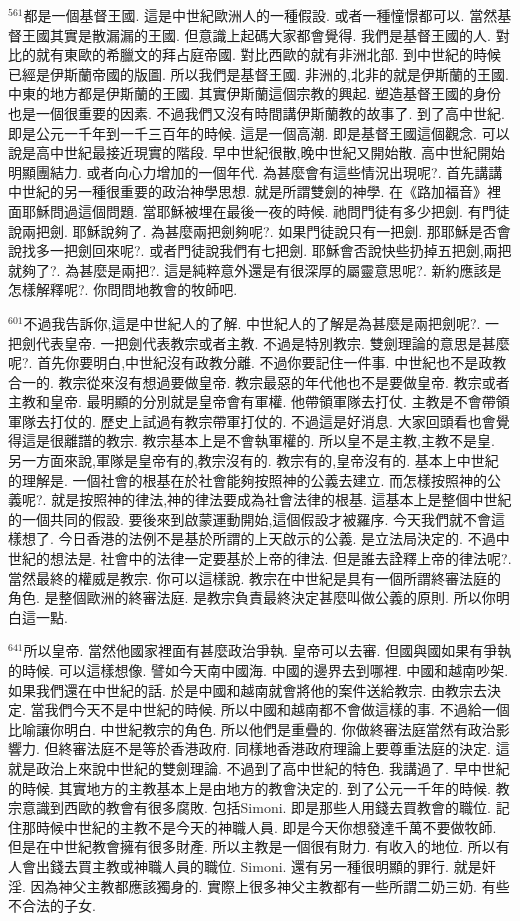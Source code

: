 \documentclass{book}
\begin{document}
$^{561}$都是一個基督王國.
這是中世紀歐洲人的一種假設.
或者一種憧憬都可以.
當然基督王國其實是散漏漏的王國.
但意識上起碼大家都會覺得.
我們是基督王國的人.
對比的就有東歐的希臘文的拜占庭帝國.
對比西歐的就有非洲北部.
到中世紀的時候已經是伊斯蘭帝國的版圖.
所以我們是基督王國.
非洲的,北非的就是伊斯蘭的王國.
中東的地方都是伊斯蘭的王國.
其實伊斯蘭這個宗教的興起.
塑造基督王國的身份也是一個很重要的因素.
不過我們又沒有時間講伊斯蘭教的故事了.
到了高中世紀.
即是公元一千年到一千三百年的時候.
這是一個高潮.
即是基督王國這個觀念.
可以說是高中世紀最接近現實的階段.
早中世紀很散,晚中世紀又開始散.
高中世紀開始明顯團結力.
或者向心力增加的一個年代.
為甚麼會有這些情況出現呢?.
首先講講中世紀的另一種很重要的政治神學思想.
就是所謂雙劍的神學.
在《路加福音》裡面耶穌問過這個問題.
當耶穌被埋在最後一夜的時候.
祂問門徒有多少把劍.
有門徒說兩把劍.
耶穌說夠了.
為甚麼兩把劍夠呢?.
如果門徒說只有一把劍.
那耶穌是否會說找多一把劍回來呢?.
或者門徒說我們有七把劍.
耶穌會否說快些扔掉五把劍,兩把就夠了?.
為甚麼是兩把?.
這是純粹意外還是有很深厚的屬靈意思呢?.
新約應該是怎樣解釋呢?.
你問問地教會的牧師吧.

$^{601}$不過我告訴你,這是中世紀人的了解.
中世紀人的了解是為甚麼是兩把劍呢?.
一把劍代表皇帝.
一把劍代表教宗或者主教.
不過是特別教宗.
雙劍理論的意思是甚麼呢?.
首先你要明白,中世紀沒有政教分離.
不過你要記住一件事.
中世紀也不是政教合一的.
教宗從來沒有想過要做皇帝.
教宗最惡的年代他也不是要做皇帝.
教宗或者主教和皇帝.
最明顯的分別就是皇帝會有軍權.
他帶領軍隊去打仗.
主教是不會帶領軍隊去打仗的.
歷史上試過有教宗帶軍打仗的.
不過這是好消息.
大家回頭看也會覺得這是很離譜的教宗.
教宗基本上是不會執軍權的.
所以皇不是主教,主教不是皇.
另一方面來說,軍隊是皇帝有的,教宗沒有的.
教宗有的,皇帝沒有的.
基本上中世紀的理解是.
一個社會的根基在於社會能夠按照神的公義去建立.
而怎樣按照神的公義呢?.
就是按照神的律法,神的律法要成為社會法律的根基.
這基本上是整個中世紀的一個共同的假設.
要後來到啟蒙運動開始,這個假設才被羅序.
今天我們就不會這樣想了.
今日香港的法例不是基於所謂的上天啟示的公義.
是立法局決定的.
不過中世紀的想法是.
社會中的法律一定要基於上帝的律法.
但是誰去詮釋上帝的律法呢?.
當然最終的權威是教宗.
你可以這樣說.
教宗在中世紀是具有一個所謂終審法庭的角色.
是整個歐洲的終審法庭.
是教宗負責最終決定甚麼叫做公義的原則.
所以你明白這一點.

$^{641}$所以皇帝.
當然他國家裡面有甚麼政治爭執.
皇帝可以去審.
但國與國如果有爭執的時候.
可以這樣想像.
譬如今天南中國海.
中國的邊界去到哪裡.
中國和越南吵架.
如果我們還在中世紀的話.
於是中國和越南就會將他的案件送給教宗.
由教宗去決定.
當我們今天不是中世紀的時候.
所以中國和越南都不會做這樣的事.
不過給一個比喻讓你明白.
中世紀教宗的角色.
所以他們是重疊的.
你做終審法庭當然有政治影響力.
但終審法庭不是等於香港政府.
同樣地香港政府理論上要尊重法庭的決定.
這就是政治上來說中世紀的雙劍理論.
不過到了高中世紀的特色.
我講過了.
早中世紀的時候.
其實地方的主教基本上是由地方的教會決定的.
到了公元一千年的時候.
教宗意識到西歐的教會有很多腐敗.
包括Simoni.
即是那些人用錢去買教會的職位.
記住那時候中世紀的主教不是今天的神職人員.
即是今天你想發達千萬不要做牧師.
但是在中世紀教會擁有很多財產.
所以主教是一個很有財力.
有收入的地位.
所以有人會出錢去買主教或神職人員的職位.
Simoni.
還有另一種很明顯的罪行.
就是奸淫.
因為神父主教都應該獨身的.
實際上很多神父主教都有一些所謂二奶三奶.
有些不合法的子女.
\end{document}
